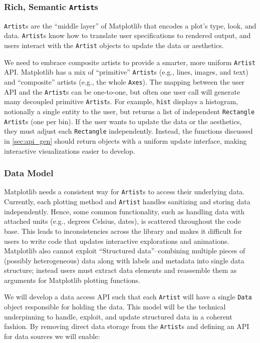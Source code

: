 \documentclass[11pt,letterpaper]{article}  %
\begin{document}
\subsubsection{Rich, Semantic \texttt{Artist}s}
\label{sec:artists}
\texttt{Artist}s are the ``middle layer'' of Matplotlib that encodes a plot's type, look, and data.  \texttt{Artist}s know how to translate user specifications to rendered output, and users interact with the \texttt{Artist} objects to update the data or aesthetics.

We need to embrace composite artists to provide a smarter, more uniform \texttt{Artist} API.
Matplotlib has a mix of ``primitive'' \texttt{Artist}s (e.g., lines, images, and text) and ``composite'' artists (e.g., the whole \texttt{Axes}). The mapping between the user API and the \texttt{Artist}s can be
one-to-one, but often one user call will generate many decoupled primitive \texttt{Artist}s.
For example, \texttt{hist} displays a histogram, notionally a single entity to the user,
but returns a list of independent \texttt{Rectangle} \texttt{Artist}s (one per bin).
If the user wants to update the data or the aesthetics, they must adjust each \texttt{Rectangle} independently.
Instead, the functions discussed in \ref{sec:api_gen} should return objects with
a uniform update interface, making interactive visualizations easier to develop.


\subsubsection{Data Model}
\label{sec:dm}
Matplotlib needs a consistent way for \texttt{Artist}s to access their underlying data. Currently, each plotting method and \texttt{Artist} handles sanitizing and storing data independently. Hence, some common functionality, such as handling data with attached units (e.g., degrees Celsius, dates), is scattered throughout the code base. This leads to inconsistencies across the library and makes it difficult for users to write code that updates interactive explorations and animations. Matplotlib also cannot exploit ``Structured data''--combining multiple pieces of (possibly heterogeneous) data along with labels and metadata into single data structure; instead users must extract data elements and reassemble them as arguments for Matplotlib plotting functions.

We will develop a data access API such that each \texttt{Artist} will have a single \texttt{Data} object responsible for holding the data. This model will be the technical underpinning to handle, exploit, and
update structured data in a coherent fashion. By removing direct data storage from the \texttt{Artist}s and defining an API for data sources we will enable:
\end{document}
